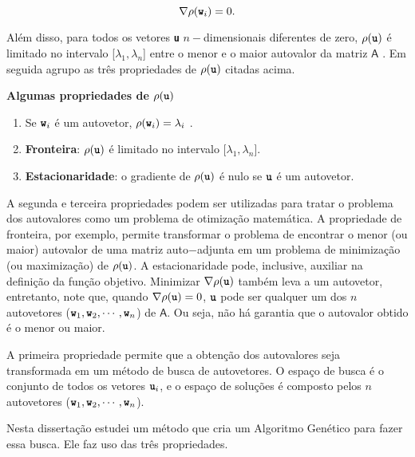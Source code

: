 	\begin{equation}\label{eq:grad_rho_nulo}
		\nabla \rho (\textbf{\texttt{w}}_i) = 0.
	\end{equation}

Além disso, para todos os vetores \textbf{\texttt{u}} $n-$dimensionais diferentes de zero, $\rho(\textbf{\texttt{u}})$ é limitado no intervalo [$\lambda_1, \lambda_n$] entre o menor e o maior autovalor da matriz $\mathsf{A}$ \cite{Parlett1998}. Em seguida agrupo as três propriedades de $\rho(\textbf{\texttt{u}})$ citadas acima.

\textbf{Algumas propriedades de $\rho(\textbf{\texttt{u}})$}

\begin{enumerate}
		
	\item Se $\textbf{\texttt{w}}_i$ é um autovetor, $\rho(\textbf{\texttt{w}}_i) = \lambda_i$ .
	
	\item \textbf{Fronteira}: $\rho(\textbf{\texttt{u}})$ é limitado no intervalo [$\lambda_1, \lambda_n$].
	
	\item \textbf{Estacionaridade}: o gradiente de $\rho(\textbf{\texttt{u}})$ é nulo se $\textbf{\texttt{u}}$ é um autovetor.
	
\end{enumerate}

	A segunda e terceira propriedades podem ser utilizadas para tratar o problema dos autovalores como um problema de otimização matemática. A propriedade de fronteira, por exemplo, permite transformar o problema de encontrar o menor (ou maior) autovalor de uma matriz auto$-$adjunta em um problema de minimização (ou maximização) de $\rho(\textbf{\texttt{u}})$. A estacionaridade pode, inclusive, auxiliar na definição da função objetivo. Minimizar $\nabla \rho(\textbf{\texttt{u}})$ também leva a um autovetor, entretanto, note que, quando $\nabla \rho(\textbf{\texttt{u}}) = 0$, $\textbf{\texttt{u}}$ pode ser qualquer um dos $n$ autovetores ($\textbf{\texttt{w}}_1, \textbf{\texttt{w}}_2, \cdots, \textbf{\texttt{w}}_n$) de $\mathsf{A}$. Ou seja, não há garantia que o autovalor obtido é o menor ou maior.

		A primeira propriedade permite que a obtenção dos autovalores seja transformada em um método de busca de autovetores. O espaço de busca é o conjunto de todos os vetores $\textbf{\texttt{u}}_i$, e o espaço de soluções é composto pelos $n$ autovetores ($\textbf{\texttt{w}}_1, \textbf{\texttt{w}}_2, \cdots, \textbf{\texttt{w}}_n$).
		
		Nesta dissertação estudei um método que cria um Algoritmo Genético para fazer essa busca. Ele faz uso das três propriedades.